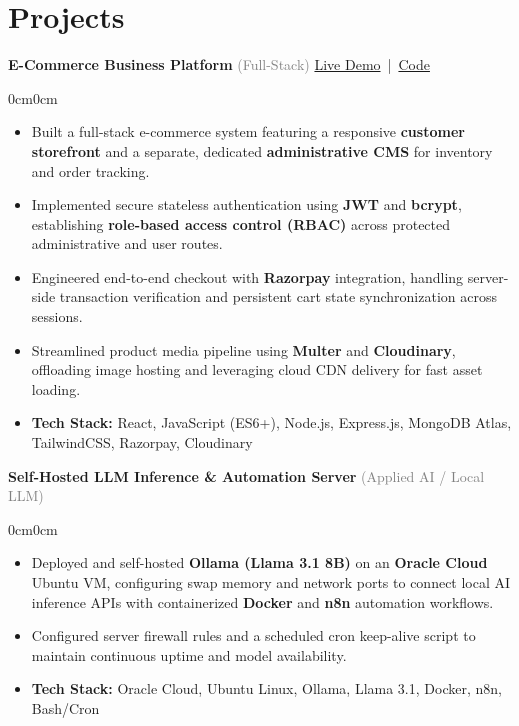 \documentclass[10pt, a4paper]{article}
\newenvironment{highlights}{
    \begin{itemize}[
        topsep=0.06 cm,
        parsep=0.03 cm,
        partopsep=0pt,
        itemsep=1.4pt,
        leftmargin=10pt
    ]
}{
    \end{itemize}
}
\newenvironment{onecolentry}{
    \begin{adjustwidth}{0cm}{0cm}
}{
    \end{adjustwidth}
}
\let\hrefWithoutArrow\href
\newcommand{\lighttext}[1]{{\fontsize{9.3pt}{11.2pt}\selectfont #1}}
\begin{document}
\section{Projects}
\vspace{0.04cm}
\noindent
\lighttext{\textbf{E-Commerce Business Platform} \textcolor{gray}{(Full-Stack)} \hfill \hrefWithoutArrow{https://perfume-frontend-dusky.vercel.app/}{Live Demo} \,|\, \hrefWithoutArrow{https://github.com/Deepanshu9229/Perfume_42}{Code}}
\vspace{0.05cm}

\begin{onecolentry}
    \begin{highlights}
        \item \lighttext{Built a full-stack e-commerce system featuring a responsive \textbf{customer storefront} and a separate, dedicated \textbf{administrative CMS} for inventory and order tracking.}
        \item \lighttext{Implemented secure stateless authentication using \textbf{JWT} and \textbf{bcrypt}, establishing \textbf{role-based access control (RBAC)} across protected administrative and user routes.}
        \item \lighttext{Engineered end-to-end checkout with \textbf{Razorpay} integration, handling server-side transaction verification and persistent cart state synchronization across sessions.}
        \item \lighttext{Streamlined product media pipeline using \textbf{Multer} and \textbf{Cloudinary}, offloading image hosting and leveraging cloud CDN delivery for fast asset loading.}
        \item \lighttext{\textbf{Tech Stack:} React, JavaScript (ES6+), Node.js, Express.js, MongoDB Atlas, TailwindCSS, Razorpay, Cloudinary}
    \end{highlights}
\end{onecolentry}

\vspace{0.14cm}
\noindent
\lighttext{\textbf{Self-Hosted LLM Inference \& Automation Server} \textcolor{gray}{(Applied AI / Local LLM)}}
\vspace{0.05cm}

\begin{onecolentry}
    \begin{highlights}
        \item \lighttext{Deployed and self-hosted \textbf{Ollama (Llama 3.1 8B)} on an \textbf{Oracle Cloud} Ubuntu VM, configuring swap memory and network ports to connect local AI inference APIs with containerized \textbf{Docker} and \textbf{n8n} automation workflows.}
        \item \lighttext{Configured server firewall rules and a scheduled cron keep-alive script to maintain continuous uptime and model availability.}
        \item \lighttext{\textbf{Tech Stack:} Oracle Cloud, Ubuntu Linux, Ollama, Llama 3.1, Docker, n8n, Bash/Cron}
    \end{highlights}
\end{onecolentry}
\end{document}

